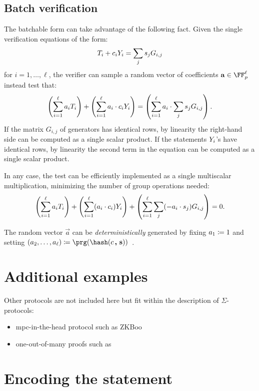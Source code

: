\documentclass[11pt]{article}
\begin{document}
\subsection{Batch verification}

The batchable form can take advantage of the following fact.
Given the single verification equations of the form:
\[
   T_i + c_i Y_i = \sum_j s_j G_{i,j}
\]
for $i=1, \dots,\ell$,
the verifier can sample a random vector of coefficients $\vec a \in \FF_p^\ell$ instead test that:
\[
  \left(\sum_{i=1}^{\ell} a_i T_i\right) + \left(\sum_{i=1}^{\ell} a_i \cdot  c_i Y_i \right) = \left(\sum_{i=1}^{\ell} a_i \cdot \sum_j s_j G_{i,j}\right).
\]
If the matrix $G_{i, j}$ of generators has identical rows, by linearity the right-hand side can be computed as a single scalar product.
If the statements $Y_i$'s have identical rows, by linearity the second term in the equation can be computed as a single scalar product.

In any case, the test can be efficiently implemented as a single multiscalar multiplication, minimizing the number of group operations needed:
\[
  \left(\sum_{i=1}^{\ell} a_i T_i\right) + \left(\sum_{i=1}^{\ell} (a_i \cdot  c_i) Y_i \right) + \left(\sum_{i=1}^{\ell}\sum_j (-a_i \cdot  s_j) G_{i,j}\right) = 0.
\]

The random vector $\vec a$ can be \emph{deterministically} generated by fixing $a_1 \coloneqq 1$ and setting $(a_2, \dots, a_{\ell}) \defeq \prg(\hash(\challenge \concat \vec s))$~\cite{bip-schnorr}.


\section{Additional examples}

Other protocols are not included here but fit within the description
of $\Sigma$-protocols:
\begin{itemize}
\item mpc-in-the-head protocol such as ZKBoo~\cite{USENIX:GiaMadOrl16}
\item one-out-of-many proofs such as~\cite{EC:GroKoh15}
\end{itemize}


\section{Encoding the statement}
\end{document}
